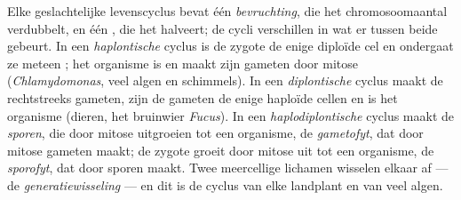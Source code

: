 \begin{definition}\label{def:b2:plant-life-cycles:cycles}
Elke geslachtelijke levenscyclus bevat één \emph{bevruchting}, die het
chromosoomaantal verdubbelt, en één \emph{}, die het halveert; de
cycli verschillen in wat er tussen beide gebeurt. In een
\emph{haplontische} cyclus is de zygote de enige diploïde cel en
ondergaat ze meteen ; het organisme is  en maakt zijn
gameten door mitose (\emph{Chlamydomonas}, veel algen en schimmels).
In een \emph{diplontische} cyclus maakt de  rechtstreeks gameten,
zijn de gameten de enige haploïde cellen en is het organisme 
(dieren, het bruinwier \emph{Fucus}). In een \emph{haplodiplontische}
cyclus maakt de  \emph{sporen}, die door mitose uitgroeien tot een
 organisme, de \emph{gametofyt}, dat door mitose gameten maakt;
de zygote groeit door mitose uit tot een  organisme, de
\emph{sporofyt}, dat door  sporen maakt. Twee meercellige lichamen
wisselen elkaar af --- de \emph{generatiewisseling} --- en dit is de
cyclus van elke landplant en van veel algen.
\end{definition}

